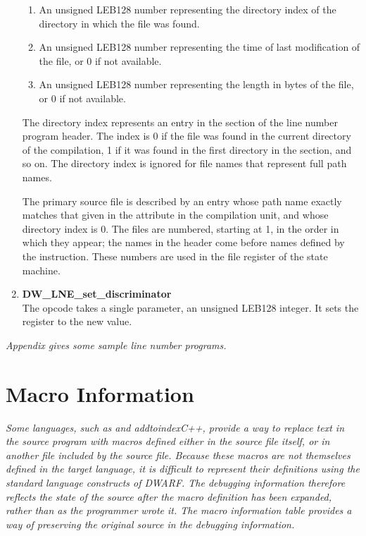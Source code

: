 \begin{enumerate}[1.]
\begin{enumerate}[1.]
\item An unsigned LEB128 number representing the directory index
of the directory in which the file was found.  

\item An unsigned
LEB128 number representing the time of last modification
of the file, or 0 if not available.  

\item An unsigned LEB128
number representing the length in bytes of the file, or 0 if
not available.
\end{enumerate}

The directory index represents an entry in the
 section of the line number program
header. The index is 0 if the file was found in the current
directory of the compilation, 1 if it was found in the first
directory in the  section,
and so on. The
directory index is ignored for file names that represent full
path names.

The primary source file is described by an entry whose path
name exactly matches that given in the  attribute
in the compilation unit, and whose directory index is 0. The
files are numbered, starting at 1, in the order in which they
appear; the names in the header come before names defined by
the  instruction. These numbers are used
in the file register of the state machine.

\item \textbf{DW\-\_LNE\-\_set\-\_discriminator} \\
The 
opcode takes a single
parameter, an unsigned LEB128 integer. It sets the
 register to the new value.



\end{enumerate}

\textit{Appendix  
gives some sample line number programs.}

\section{Macro Information}
\label{chap:macroinformation}
\textit{Some languages, such as 
 and 
addtoindex{C++}, provide a way to replace
text in the source program with macros defined either in the
source file itself, or in another file included by the source
file.  Because these macros are not themselves defined in the
target language, it is difficult to represent their definitions
using the standard language constructs of DWARF. The debugging
information therefore reflects the state of the source after
the macro definition has been expanded, rather than as the
programmer wrote it. The macro information table provides a way
of preserving the original source in the debugging information.}

